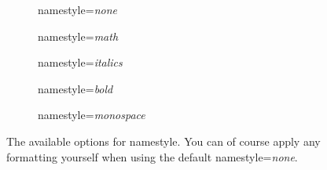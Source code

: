 \documentclass{article}
\begin{document}
\begin{figure}[!h]
    \begin{subfigure}{0.3\textwidth}
        \centering
        \begin{af}[namestyle=none]
    
        \end{af}
        \caption{\textsf{namestyle}=\textit{none}}
        \label{fig:namestyle_none}
    \end{subfigure}
    \hfill
    \begin{subfigure}{0.3\textwidth}
        \centering
        \begin{af}[namestyle=math]
    
        \end{af}
        \caption{\textsf{namestyle}=\textit{math}}
        \label{fig:namestyle_math}
    \end{subfigure}
    \hfill
    \begin{subfigure}{0.3\textwidth}
        \centering
        \begin{af}[namestyle=italics]
    
        \end{af}
        \caption{\textsf{namestyle}=\textit{italics}}
        \label{fig:namestyle_italics}
    \end{subfigure}
    \par\bigskip
    \begin{subfigure}{0.49\textwidth}
        \centering
        \begin{af}[namestyle=bold]
    
        \end{af}
        \caption{\textsf{namestyle}=\textit{bold}}
        \label{fig:namestyle_bold}
    \end{subfigure}
    \hfill
    \begin{subfigure}{0.49\textwidth}
        \centering
        \begin{af}[namestyle=monospace]
    
        \end{af}
        \caption{\textsf{namestyle}=\textit{monospace}}
        \label{fig:namestyle_monospace}
    \end{subfigure}
    \caption{The available options for \textsf{namestyle}. You can of course apply any formatting yourself when using the default \textsf{namestyle}=\textit{none}.}
    \label{fig:namestyle}
\end{figure}
\end{document}
